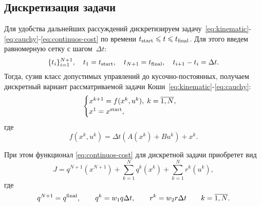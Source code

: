 \documentclass[../../doc.tex]{subfiles}
\begin{document}
    \subsection{Дискретизация задачи}

    Для удобства дальнейших рассуждений дискретизируем задачу~\eqref{eq:kinematic}-\eqref{eq:cauchy}-\eqref{eq:continuos-cost} по времени $t_{\textnormal{start}} \leqslant t \leqslant t_{\textnormal{final}}$.
    Для этого введем равномерную сетку с шагом~$\Delta t$:
    $$
        \{ t_i \}_{i=1}^{N+1}, \quad t_1 = t_{\textnormal{start}}, \quad t_{N+1} = t_{\textnormal{final}}, \quad t_{i+1} - t_{i} = \Delta t.
    $$
    Тогда, сузив класс допустимых управлений до кусочно-постоянных, получаем дискретный вариант рассматриваемой задачи Коши~\eqref{eq:kinematic}-\eqref{eq:cauchy}:
    \begin{equation}\label{eq:discrete-system}
        \begin{cases}
            x^{k+1} = f(x^k, u^k),\; k=\overline{1,N}, \\
            x^{1} = x^{\textnormal{start}},
        \end{cases}
    \end{equation}
    где
    \begin{equation*}
        f(x^k, u^k) = \Delta t \left(A(x^k) + B u^k \right) + x^k.
    \end{equation*}

    При этом функционал \eqref{eq:continuos-cost} для дискретной задачи приобретет вид
    \begin{equation}\label{eq:discrete-cost}
        J = q^{N+1}(x^{N+1}) + \sum_{k=1}^{N} q^k(x^k) + \sum_{k=1}^{N} r^k(u^k),
    \end{equation}
    где
    \begin{equation*}
        q^{N+1} = q^{\textnormal{final}},
        \qquad
        q^k = w_1 q \Delta t,
        \qquad
        r^k = w_2 r \Delta t
        \qquad
        k = \overline{1,N}.
    \end{equation*}

    \ifSubfilesClassLoaded{
        \nocite{*}
        \clearpage
        
        
    }{}
\end{document}

